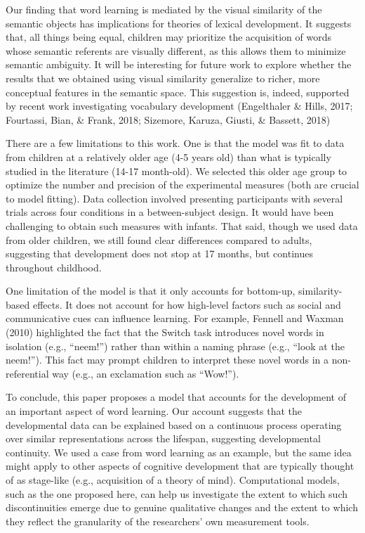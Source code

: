 \documentclass[english,,man,floatsintext]{apa6}
\theoremstyle{definition}
\theoremstyle{definition}
\theoremstyle{definition}
\theoremstyle{remark}
\begin{document}
Our finding that word learning is mediated by the visual similarity of
the semantic objects has implications for theories of lexical
development. It suggests that, all things being equal, children may
prioritize the acquisition of words whose semantic referents are
visually different, as this allows them to minimize semantic ambiguity.
It will be interesting for future work to explore whether the results
that we obtained using visual similarity generalize to richer, more
conceptual features in the semantic space. This suggestion is, indeed,
supported by recent work investigating vocabulary development
(Engelthaler \& Hills, 2017; Fourtassi, Bian, \& Frank, 2018; Sizemore,
Karuza, Giusti, \& Bassett, 2018)

There are a few limitations to this work. One is that the model was fit
to data from children at a relatively older age (4-5 years old) than
what is typically studied in the literature (14-17 month-old). We
selected this older age group to optimize the number and precision of
the experimental measures (both are crucial to model fitting). Data
collection involved presenting participants with several trials across
four conditions in a between-subject design. It would have been
challenging to obtain such measures with infants. That said, though we
used data from older children, we still found clear differences compared
to adults, suggesting that development does not stop at 17 months, but
continues throughout childhood.

One limitation of the model is that it only accounts for bottom-up,
similarity-based effects. It does not account for how high-level factors
such as social and communicative cues can influence learning. For
example, Fennell and Waxman (2010) highlighted the fact that the Switch
task introduces novel words in isolation (e.g., \enquote{neem!}) rather
than within a naming phrase (e.g., \enquote{look at the neem!}). This
fact may prompt children to interpret these novel words in a
non-referential way (e.g., an exclamation such as \enquote{Wow!}).

To conclude, this paper proposes a model that accounts for the
development of an important aspect of word learning. Our account
suggests that the developmental data can be explained based on a
continuous process operating over similar representations across the
lifespan, suggesting developmental continuity. We used a case from word
learning as an example, but the same idea might apply to other aspects
of cognitive development that are typically thought of as stage-like
(e.g., acquisition of a theory of mind). Computational models, such as
the one proposed here, can help us investigate the extent to which such
discontinuities emerge due to genuine qualitative changes and the extent
to which they reflect the granularity of the researchers' own
measurement tools.
\end{document}

